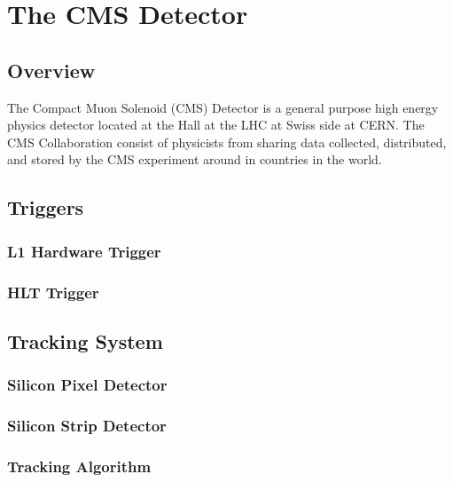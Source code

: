 \chapter{The CMS Detector}

\section{Overview}

The Compact Muon Solenoid (CMS) Detector is a general purpose high energy physics detector located at the Hall at the LHC at Swiss side at CERN. The CMS Collaboration consist of physicists from sharing data collected, distributed, and stored by the CMS experiment around in countries in the world.

\section{Triggers}

\subsection{L1 Hardware Trigger}

\subsection{HLT Trigger}

\section{Tracking System}

\subsection{Silicon Pixel Detector}

\subsection{Silicon Strip Detector}

\subsection{Tracking Algorithm}

